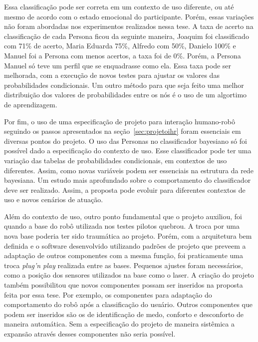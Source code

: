 Essa classificação pode ser correta em um contexto de uso diferente, ou até mesmo de acordo com o estado emocional do participante. Porém, essas variações não foram abordadas nos experimentos realizados nessa tese. A taxa de acerto na classificação de cada Persona ficou da seguinte maneira, Joaquim foi classificado com 71\% de acerto, Maria Eduarda 75\%, Alfredo com 50\%, Danielo 100\% e Manuel foi a Persona com menos acertos, a taxa foi de 0\%. Porém, a Persona Manuel só teve um perfil que se enquadrasse como ela. Essa taxa pode ser melhorada, com a execução de novos testes para ajustar os valores das probabilidades condicionais. Um outro método para que seja feito uma melhor distribuição dos valores de probabilidades entre os nós é o uso de um algortimo de aprendizagem.

Por fim, o uso de uma especificação de projeto para interação humano-robô seguindo os passos apresentados na seção~\ref{sec:projetoihr} foram essenciais em diversas pontos do projeto. O uso das Personas no classificador bayesiano só foi possível dado a especificação do contexto de uso. Esse classificador pode ter uma variação das tabelas de probabilidades condicionais, em contextos de uso diferentes. Assim, como novas variáveis podem ser essenciais na estrutura da rede bayesiana. Um estudo mais aprofundado sobre o comportamento do classificador deve ser realizado. Assim, a proposta pode evoluir para diferentes contextos de uso e novos cenários de atuação.

Além do contexto de uso, outro ponto fundamental que o projeto auxiliou, foi quando a base do robô utilizada nos testes pilotos quebrou. A troca por uma nova base poderia ter sido traumática ao projeto. Porém, com a arquitetura bem definida e o software desenvolvido utilizando padrões de projeto que preveem a adaptação de outros componentes com a mesma função, foi praticamente uma troca \emph{plug'n play} realizada entre as bases. Pequenos ajustes foram necessários, como a posição dos sensores utilizados na base como o laser. A criação do projeto também possibilitou que novos componentes possam ser inseridos na proposta feita por essa tese. Por exemplo, os componentes para adaptação do comportamento do robô após a classificação do usuário. Outros componentes que podem ser inseridos são os de identificação de medo, conforto e desconforto de maneira automática. Sem a especificação do projeto de maneira sistêmica a expansão através desses componentes não seria possível.
